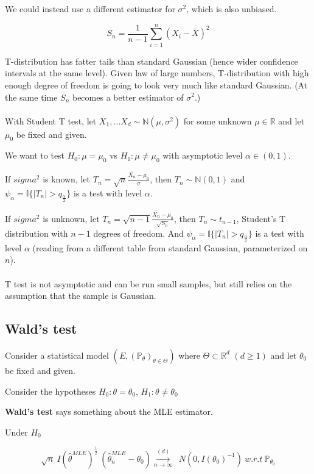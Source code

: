 \documentclass{article}
\begin{document}
We could instead use a different estimator for $\sigma^2$, which is also unbiased.

$$
S_n = \frac{1}{n - 1}\sum_{i = 1}^{n}(X_i - \bar{X})^2
$$

T-distribution has fatter tails than standard Gaussian (hence wider confidence intervals at the same level).
Given law of large numbers, T-distribution with high enough degree of freedom is going to look very much like standard Gaussian.
(At the same time $S_n$ becomes a better estimator of $\sigma^2$.)
\\
\\

With Student T test, let $X_1, \dots X_d \sim \mathbb{N}(\mu, \sigma^2)$ for some unknown $\mu \in \mathbb{R}$ and let $\mu_0$ be fixed and given.

We want to test $H_0: \mu = \mu_0$ vs $H_1: \mu \neq \mu_0$ with asymptotic level $\alpha \in (0, 1)$.

If $sigma^2$ is known, let $T_n = \sqrt{n} \frac{\bar{X_n} - \mu_0}{\sigma}$, then $T_n \sim \mathbb{N}(0, 1)$ and
$\psi_{\alpha} = \mathbb{I}\{|T_n| > q_{\frac{\alpha}{2}}\}$ is a test with level $\alpha$.

If $sigma^2$ is unknown, let $T_n = \sqrt{n - 1}\frac{\bar{X_n} - \mu_0}{\sqrt{S_n}}$, then $T_n \sim t_{n - 1}$, Student's T distribution with $n - 1$ degrees of freedom. And
$\psi_{\alpha} = \mathbb{I}\{|T_n| > q_{\frac{\alpha}{2}}\}$ is a test with level $\alpha$ (reading from a different table from standard Gaussian, parameterized on $n$).
\\
\\
T test is not asymptotic and can be run small samples, but still relies on the assumption that the sample is Gaussian.

\subsection{Wald's test}

Consider a statistical model $(E, (\mathbb{P}_\theta)_{\theta \in \Theta})$ where $\Theta \subset \mathbb{R}^d$ $(d \geq 1)$ and let $\theta_0$ be fixed and given.

Consider the hypotheses $H_0: \theta = \theta_0$, $H_1: \theta \neq \theta_0$

\textbf{Wald's test} says something about the MLE estimator.

Under $H_0$

$$
\sqrt{n} ~ I(\hat{\theta}^{MLE})^{\frac{1}{2}} ~ (\hat{\theta}^{MLE}_{n} - \theta_0) \overset{(d)}{\underset{n \to \infty}{\longrightarrow}} ~ ~ \mathit{N}(0, I(\theta_0)^{-1}) ~ w.r.t ~ \mathbb{P}_{\theta_0}
$$
\end{document}
